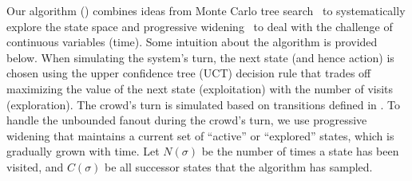 %
%
%

Our algorithm () combines ideas from Monte Carlo tree search~\citep{kocsis2006bandit} to systematically explore the state space and 
progressive widening~\citep{coulom2007computing} to deal with the challenge of continuous variables (time).
Some intuition about the algorithm is provided below.
When simulating the system's turn, the next state (and hence action) is chosen using the upper confidence tree (UCT) decision rule that trades off maximizing the value of the next state (exploitation) with the number of visits (exploration).
The crowd's turn is simulated based on transitions defined in .
To handle the unbounded fanout during the crowd's turn, we use progressive widening  
that maintains a current set of ``active'' or ``explored'' states, which is gradually grown with time. 
Let $N(\sigma)$ be the number of times a state has been visited,
and $C(\sigma)$ be all successor states that the algorithm has sampled.

